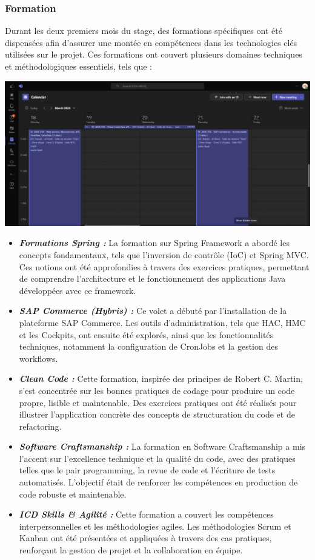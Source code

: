 \subsubsection{Formation}
Durant les deux premiers mois du stage, des formations spécifiques ont été dispensées afin d'assurer une montée en compétences dans les technologies clés utilisées sur le projet. Ces formations ont couvert plusieurs domaines techniques et méthodologiques essentiels, tels que :
\begin{center}
    \centering
    \includegraphics[width=19cm]{Figures/formation.png}
    \label{fig:structure_payment}
\end{center}
\begin{itemize}
    \item \textbf{\textit{Formations Spring :}}
    La formation sur Spring Framework a abordé les concepts fondamentaux, tels que l'inversion de contrôle (IoC) et Spring MVC. Ces notions ont été approfondies à travers des exercices pratiques, permettant de comprendre l'architecture et le fonctionnement des applications Java développées avec ce framework.
    \item \textbf{\textit{SAP Commerce (Hybris) :}} Ce volet a débuté par l’installation de la plateforme SAP Commerce. Les outils d’administration, tels que HAC, HMC et les Cockpits, ont ensuite été explorés, ainsi que les fonctionnalités techniques, notamment la configuration de CronJobs et la gestion des workflows.    \item \textbf{\textit{Clean Code :}} Cette formation, inspirée des principes de Robert C. Martin, s'est concentrée sur les bonnes pratiques de codage pour produire un code propre, lisible et maintenable. Des exercices pratiques ont été réalisés pour illustrer l'application concrète des concepts de structuration du code et de refactoring.
    \item \textbf{\textit{Software Craftsmanship :}} La formation en Software Craftsmanship a mis l'accent sur l'excellence technique et la qualité du code, avec des pratiques telles que le pair programming, la revue de code et l'écriture de tests automatisés. L'objectif était de renforcer les compétences en production de code robuste et maintenable.
    \item \textbf{\textit{ICD Skills \& Agilité :}} Cette formation a couvert les compétences interpersonnelles et les méthodologies agiles. Les méthodologies Scrum et Kanban ont été présentées et appliquées à travers des cas pratiques, renforçant la gestion de projet et la collaboration en équipe.
\end{itemize}
